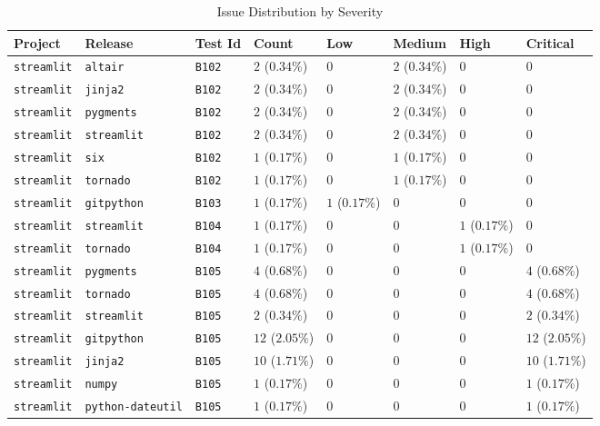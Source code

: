 \begin{table}
\caption{Issue Distribution by Severity}
\label{tab:issue-distribution}
\begin{tabular}{llllllll}
\toprule
Project & Release & Test Id & Count & Low & Medium & High & Critical \\
\midrule
\texttt{streamlit} & \texttt{altair} & \texttt{B102} & $2$ ($0.34\%$) & $0$ & $2$ ($0.34\%$) & $0$ & $0$ \\
\texttt{streamlit} & \texttt{jinja2} & \texttt{B102} & $2$ ($0.34\%$) & $0$ & $2$ ($0.34\%$) & $0$ & $0$ \\
\texttt{streamlit} & \texttt{pygments} & \texttt{B102} & $2$ ($0.34\%$) & $0$ & $2$ ($0.34\%$) & $0$ & $0$ \\
\texttt{streamlit} & \texttt{streamlit} & \texttt{B102} & $2$ ($0.34\%$) & $0$ & $2$ ($0.34\%$) & $0$ & $0$ \\
\texttt{streamlit} & \texttt{six} & \texttt{B102} & $1$ ($0.17\%$) & $0$ & $1$ ($0.17\%$) & $0$ & $0$ \\
\texttt{streamlit} & \texttt{tornado} & \texttt{B102} & $1$ ($0.17\%$) & $0$ & $1$ ($0.17\%$) & $0$ & $0$ \\
\texttt{streamlit} & \texttt{gitpython} & \texttt{B103} & $1$ ($0.17\%$) & $1$ ($0.17\%$) & $0$ & $0$ & $0$ \\
\texttt{streamlit} & \texttt{streamlit} & \texttt{B104} & $1$ ($0.17\%$) & $0$ & $0$ & $1$ ($0.17\%$) & $0$ \\
\texttt{streamlit} & \texttt{tornado} & \texttt{B104} & $1$ ($0.17\%$) & $0$ & $0$ & $1$ ($0.17\%$) & $0$ \\
\texttt{streamlit} & \texttt{pygments} & \texttt{B105} & $4$ ($0.68\%$) & $0$ & $0$ & $0$ & $4$ ($0.68\%$) \\
\texttt{streamlit} & \texttt{tornado} & \texttt{B105} & $4$ ($0.68\%$) & $0$ & $0$ & $0$ & $4$ ($0.68\%$) \\
\texttt{streamlit} & \texttt{streamlit} & \texttt{B105} & $2$ ($0.34\%$) & $0$ & $0$ & $0$ & $2$ ($0.34\%$) \\
\texttt{streamlit} & \texttt{gitpython} & \texttt{B105} & $12$ ($2.05\%$) & $0$ & $0$ & $0$ & $12$ ($2.05\%$) \\
\texttt{streamlit} & \texttt{jinja2} & \texttt{B105} & $10$ ($1.71\%$) & $0$ & $0$ & $0$ & $10$ ($1.71\%$) \\
\texttt{streamlit} & \texttt{numpy} & \texttt{B105} & $1$ ($0.17\%$) & $0$ & $0$ & $0$ & $1$ ($0.17\%$) \\
\texttt{streamlit} & \texttt{python-dateutil} & \texttt{B105} & $1$ ($0.17\%$) & $0$ & $0$ & $0$ & $1$ ($0.17\%$) \\

\end{tabular}
\end{table}
